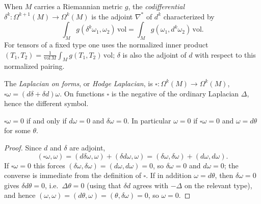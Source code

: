 \begin{definition}
  \label{def:pet-ch9-codifferential}
  When $M$ carries a Riemannian metric $g$, the \emph{codifferential}
  $\delta^k:\Omega^{k+1}(M)\to\Omega^k(M)$ is the adjoint $\nabla^*$ of $d^k$
  characterized by
  \[
    \int_Mg(\delta^k\omega_1,\omega_2)\,\mathrm{vol}=\int_Mg(\omega_1,d^k\omega_2)\,\mathrm{vol}.
  \]
  For tensors of a fixed type one uses the normalized inner product
  $(T_1,T_2)=\tfrac1{\mathrm{vol}\,M}\int_Mg(T_1,T_2)\,\mathrm{vol}$; $\delta$ is also the
  adjoint of $d$ with respect to this normalized pairing.
\end{definition}

\begin{definition}
  \label{def:pet-ch9-hodge-laplacian}
  The \emph{Laplacian on forms}, or \emph{Hodge Laplacian}, is
  $\square:\Omega^k(M)\to\Omega^k(M)$, $\square\omega=(d\delta+\delta d)\omega$.
  On functions $\square$ is the negative of the ordinary Laplacian $\Delta$,
  hence the different symbol.
\end{definition}

\begin{lemma}[Lemma 9.1.1]
  \label{lem:pet-ch9-harmonic-iff-closed-coclosed}
  $\square\omega=0$ if and only if $d\omega=0$ and $\delta\omega=0$. In
  particular $\omega=0$ if $\square\omega=0$ and $\omega=d\theta$ for some
  $\theta$.
\end{lemma}
\begin{proof}
  Since $d$ and $\delta$ are adjoint,
  \[
    (\square\omega,\omega)=(d\delta\omega,\omega)+(\delta d\omega,\omega)
    =(\delta\omega,\delta\omega)+(d\omega,d\omega).
  \]
  If $\square\omega=0$ this forces $(\delta\omega,\delta\omega)=(d\omega,d\omega)=0$,
  so $\delta\omega=0$ and $d\omega=0$; the converse is immediate from the
  definition of $\square$. If in addition $\omega=d\theta$, then $\delta\omega=0$
  gives $\delta d\theta=0$, i.e.\ $\Delta\theta=0$ (using that $\delta d$ agrees
  with $-\Delta$ on the relevant type), and hence
  $(\omega,\omega)=(d\theta,\omega)=(\theta,\delta\omega)=0$, so $\omega=0$.
\end{proof}

